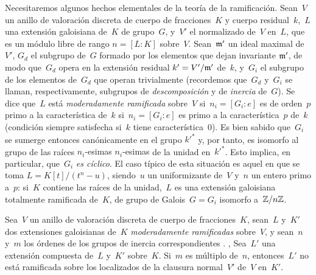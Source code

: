 Necesitaremos
algunos hechos elementales de la teoría de la ramificación. Sean~$V$ un
anillo de valoración discreta de cuerpo de fracciones~$K$ y cuerpo
residual~$k$,~$L$ una extensión galoisiana de~$K$ de grupo~$G$, y~$V'$ el
normalizado de~$V$ en~$L$, que es un módulo libre de rango
$n=[L{\colon }K]$ sobre~$V$. Sean~$\mathfrak{m'}$ un ideal maximal de~$V'$,
$G_d$ el subgrupo de~$G$ formado por los elementos que dejan invariante
$\mathfrak{m'}$, de modo que~$G_d$ opera en la extensión residual
$k'=V'/\mathfrak{m'}$ de~$k$, y~$G_i$ el subgrupo de los elementos de~$G_d$ que
operan trivialmente (recordemos que~$G_d$ y~$G_i$ se llaman, respectivamente,
subgrupos de \emph{descomposición} y de \emph{inercia} de~$G$). Se dice que~$L$
está \emph{moderadamente ramificada} sobre~$V$
{si~$n_i=[G_i{\colon }e]$ es de orden~$p$ primo a la característica de~$k$}
{si~$n_i=[G_i{\colon }e]$ es primo a la característica~$p$ de~$k$}
(condición siempre satisfecha si~$k$ tiene característica~0).
Es bien sabido que~$G_i$ se sumerge entonces canónicamente en el grupo
${k'}^*$ y, por tanto, es isomorfo al grupo de las raíces
{$n_i$-esimas}
{$n_i$-esimas}
de la unidad en~${k'}^*$. Esto implica, en particular, que~$G_i$ \emph{es
cíclico}. El caso típico de esta situación es aquel en que se toma
$L=K[t]/(t^n-u)$, siendo~$u$ un uniformizante de~$V$ y~$n$ un entero primo
a~$p$: si~$K$ contiene las raíces \niemes de la unidad,~$L$ es una extensión
galoisiana totalmente ramificada de~$K$, de grupo de Galois~$G=G_i$ isomorfo
a~$\mathbb Z/n\mathbb Z$.

\begin{lemme}
\label{X.3.6}
%
%
Sea~$V$ un anillo de valoración discreta de cuerpo de fracciones~$K$, sean~$L$
y~$K'$ dos extensiones galoisianas de~$K$ \emph{moderadamente ramificadas}
sobre~$V$, y sean~$n$ y~$m$ los órdenes de los grupos de inercia
correspondientes
{.}
{,}
Sea~$L'$ una extensión compuesta de~$L$ y~$K'$ sobre~$K$. Si~$m$ es múltiplo
de~$n$, entonces~$L'$ no está ramificada sobre los localizados de la clausura
normal~$V'$ de~$V$ en~$K'$.
\end{lemme}

